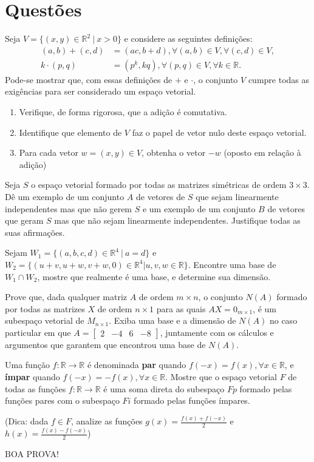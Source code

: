 \documentclass[12pt,a4paper]{article}
\newcommand{\fixme}{{\color{red}(...)}}
\newcommand*\R{\mathbb{R}}
\begin{document}
\section*{Questões}
\begin{ExerciseList}
\Exercise[title={2,5}] Seja $V = \{ (x,y) \in \R^2 \ |\ x > 0 \}$ e considere as seguintes definições:
\begin{align*}
(a,b) + (c,d)  & = (ac, b + d), \forall (a, b) \in V, \forall (c, d) \in V, \\
k \cdot (p, q) & = (p^k, kq), \forall (p, q) \in V, \forall k \in \R.
\end{align*}
Pode-se mostrar que, com essas definições de $+$ e $\cdot$, o conjunto $V$ cumpre todas as exigências para ser considerado um espaço vetorial.
\begin{enumerate}
\item Verifique, de forma rigorosa, que a adição é comutativa.
\item Identifique que elemento de $V$ faz o papel de vetor nulo deste espaço vetorial.
\item Para cada vetor $w = (x,y) \in V$, obtenha o vetor $-w$ (oposto em relação à adição)
\end{enumerate}
\Answer \fixme

\Exercise[title={2,5}] Seja $S$ o espaço vetorial formado por todas as matrizes simétricas de ordem $3 \times 3$. Dê um exemplo de um conjunto $A$ de vetores de $S$ que sejam linearmente independentes mas que não gerem $S$ e um exemplo de um conjunto $B$ de vetores que geram $S$ mas que não sejam linearmente independentes. Justifique todas as suas afirmações.
\Answer \fixme

\Exercise[title={2,5}] Sejam $W_1= \{ (a,b,c,d) \in \R^4\ |\ a = d\}$ e $W_2= \{ (u+v,u+w,v+w, 0) \in \R^4 | u,v,w \in \R \}$. Encontre uma base de $W_1 \cap W_2$, mostre que realmente é uma base, e determine sua dimensão.
\Answer \fixme

\Exercise[title={2,5}] Prove que, dada qualquer matriz $A$ de ordem $m \times n$, o conjunto $N(A)$ formado por todas as matrizes $X$ de ordem $n \times 1$ para as quais $A X = 0_{m\times 1}$, é um subespaço vetorial de $M_{n \times 1}$. Exiba uma base e a dimensão de $N(A)$ no caso particular em que $A = \begin{bmatrix}
2 & -4 & 6 & -8
\end{bmatrix}$, juntamente com os cálculos e argumentos que garantem que encontrou uma base de $N(A)$.
\Answer \fixme

\Exercise[title={2,5}] Uma função $f: \R \to \R$ é denominada \textbf{par} quando $f(-x) = f(x), \forall x \in \R$, e \textbf{ímpar} quando $f(-x) = -f(x), \forall x \in \R$. Mostre que o espaço vetorial $F$ de todas as funções $f: \R \to \R$ é uma soma direta do subespaço $Fp$ formado pelas funções pares com o subespaço $Fi$ formado pelas funções ímpares.

(Dica: dada $f \in F$, analize as funções $g(x) = \frac{f(x) + f(-x)}{2}$ e $h(x) = \frac{f(x) - f(-x)}{2}$)
\Answer \fixme
\end{ExerciseList}

\begin{center}
BOA PROVA!
\end{center}

\end{document}
